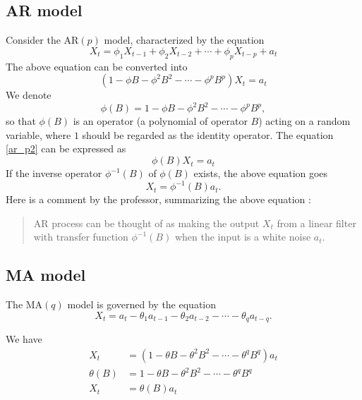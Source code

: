 \documentclass{article}
\newcommand\ar{\ensuremath{\text{AR}}}
\newcommand\ma{\ensuremath{\text{MA}}}
\begin{document}
\subsection{AR model}
Consider the \(\ar(p)\) model, characterized by the equation
\begin{equation}\label{ar_p1}
X_t=\phi_1X_{t-1}+\phi_2X_{t-2}+\cdots+\phi_pX_{t-p}+a_t
\end{equation}
The above equation can be converted into
\begin{equation}\label{ar_p2}
(1-\phi B-\phi^2B^2-\cdots-\phi^pB^p)X_t=a_t
\end{equation}
We denote
\begin{equation}\label{ar_p3}
\phi(B)=1-\phi B-\phi^2B^2-\cdots-\phi^pB^p,
\end{equation}
so that \(\phi(B)\) is an operator (a polynomial of operator \(B\)) acting on a random variable, where \(1\) should be regarded as the identity operator.
The equation \eqref{ar_p2} can be expressed as
\begin{equation}\label{ar_p4}
\phi(B)X_t=a_t
\end{equation}
If the inverse operator \(\phi^{-1}(B)\) of \(\phi(B)\) exists\footnotemark, the above equation goes
\[X_t=\phi^{-1}(B)a_t.\]
Here is a comment by the professor, summarizing the above equation :
\begin{quote}
AR process can be thought of as making the output \(X_t\) from a linear filter with transfer function \(\phi^{-1}(B)\) when the input is a white noise \(a_t\).
\end{quote}

%
\subsection{MA model}
The \(\ma(q)\) model is governed by the equation\footnotemark
\begin{equation}\label{ma_q1}
X_t=a_t-\theta_1a_{t-1}-\theta_2a_{t-2}-\cdots-\theta_qa_{t-q}.
\end{equation}

We have
\begin{align}
X_t&=(1-\theta B-\theta^2B^2-\cdots-\theta^qB^q)a_t
\label{ma_q2}\\
\theta(B)&=1-\theta B-\theta^2B^2-\cdots-\theta^qB^q
\label{ma_q3}\\
X_t&=\theta(B)a_t
\label{ma_q4}
\end{align}
\end{document}

